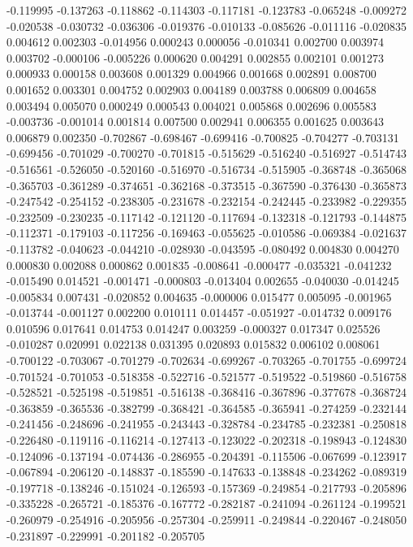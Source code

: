-0.119995
-0.137263
-0.118862
-0.114303
-0.117181
-0.123783
-0.065248
-0.009272
-0.020538
-0.030732
-0.036306
-0.019376
-0.010133
-0.085626
-0.011116
-0.020835
0.004612
0.002303
-0.014956
0.000243
0.000056
-0.010341
0.002700
0.003974
0.003702
-0.000106
-0.005226
0.000620
0.004291
0.002855
0.002101
0.001273
0.000933
0.000158
0.003608
0.001329
0.004966
0.001668
0.002891
0.008700
0.001652
0.003301
0.004752
0.002903
0.004189
0.003788
0.006809
0.004658
0.003494
0.005070
0.000249
0.000543
0.004021
0.005868
0.002696
0.005583
-0.003736
-0.001014
0.001814
0.007500
0.002941
0.006355
0.001625
0.003643
0.006879
0.002350
-0.702867
-0.698467
-0.699416
-0.700825
-0.704277
-0.703131
-0.699456
-0.701029
-0.700270
-0.701815
-0.515629
-0.516240
-0.516927
-0.514743
-0.516561
-0.526050
-0.520160
-0.516970
-0.516734
-0.515905
-0.368748
-0.365068
-0.365703
-0.361289
-0.374651
-0.362168
-0.373515
-0.367590
-0.376430
-0.365873
-0.247542
-0.254152
-0.238305
-0.231678
-0.232154
-0.242445
-0.233982
-0.229355
-0.232509
-0.230235
-0.117142
-0.121120
-0.117694
-0.132318
-0.121793
-0.144875
-0.112371
-0.179103
-0.117256
-0.169463
-0.055625
-0.010586
-0.069384
-0.021637
-0.113782
-0.040623
-0.044210
-0.028930
-0.043595
-0.080492
0.004830
0.004270
0.000830
0.002088
0.000862
0.001835
-0.008641
-0.000477
-0.035321
-0.041232
-0.015490
0.014521
-0.001471
-0.000803
-0.013404
0.002655
-0.040030
-0.014245
-0.005834
0.007431
-0.020852
0.004635
-0.000006
0.015477
0.005095
-0.001965
-0.013744
-0.001127
0.002200
0.010111
0.014457
-0.051927
-0.014732
0.009176
0.010596
0.017641
0.014753
0.014247
0.003259
-0.000327
0.017347
0.025526
-0.010287
0.020991
0.022138
0.031395
0.020893
0.015832
0.006102
0.008061
-0.700122
-0.703067
-0.701279
-0.702634
-0.699267
-0.703265
-0.701755
-0.699724
-0.701524
-0.701053
-0.518358
-0.522716
-0.521577
-0.519522
-0.519860
-0.516758
-0.528521
-0.525198
-0.519851
-0.516138
-0.368416
-0.367896
-0.377678
-0.368724
-0.363859
-0.365536
-0.382799
-0.368421
-0.364585
-0.365941
-0.274259
-0.232144
-0.241456
-0.248696
-0.241955
-0.243443
-0.328784
-0.234785
-0.232381
-0.250818
-0.226480
-0.119116
-0.116214
-0.127413
-0.123022
-0.202318
-0.198943
-0.124830
-0.124096
-0.137194
-0.074436
-0.286955
-0.204391
-0.115506
-0.067699
-0.123917
-0.067894
-0.206120
-0.148837
-0.185590
-0.147633
-0.138848
-0.234262
-0.089319
-0.197718
-0.138246
-0.151024
-0.126593
-0.157369
-0.249854
-0.217793
-0.205896
-0.335228
-0.265721
-0.185376
-0.167772
-0.282187
-0.241094
-0.261124
-0.199521
-0.260979
-0.254916
-0.205956
-0.257304
-0.259911
-0.249844
-0.220467
-0.248050
-0.231897
-0.229991
-0.201182
-0.205705
